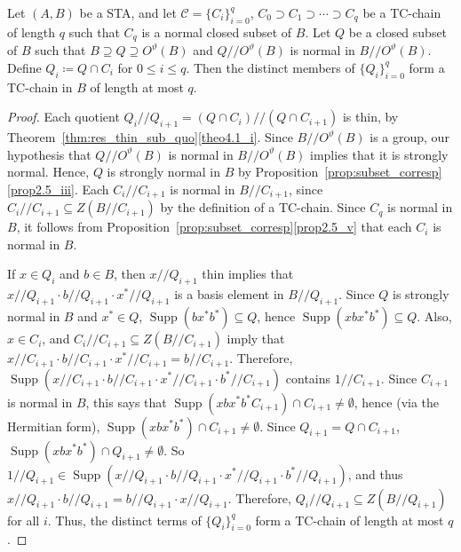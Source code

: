 \documentclass[ALCO,ThmDefs,Unicode,epreuves]{cedram}
\DeclareMathOperator{\Supp}{Supp}
\begin{document}
\begin{lemm}
\label{lem:to_lower}
Let $(A, B)$ be a STA, and let $\mathcal{C} =
\{C_i\}_{i=0}^q$, $C_0 \supset C_1 \supset \cdots \supset C_q$ 
be a TC-chain of length $q$ such that $C_q$ is a normal closed subset of
$B$. 
 Let $Q$ be a closed subset of $B$ such that $B \supseteq Q \supseteq
O^{\vartheta}(B)$ and $Q//O^{\vartheta}(B)$ is normal in
$B//O^{\vartheta}(B)$. Define $Q_i \coloneqq Q\cap C_i$ for $0 \leq i \leq q$. 
Then the distinct members of $\{Q_i\}_{i=0}^q$ form a TC-chain in $B$ of length
at most $q$.
\end{lemm}

\begin{proof}
Each quotient $Q_i//Q_{i+1} = (Q\cap C_i)//(Q\cap C_{i+1})$
is thin, by Theorem~\ref{thm:res_thin_sub_quo}\ref{theo4.1_i}. Since
$B//O^{\vartheta}(B)$ is a group, our hypothesis that
$Q//O^{\vartheta}(B)$ is normal in $B//O^{\vartheta}(B)$ implies that it
is strongly normal. Hence, $Q$ is strongly normal in $B$ by Proposition~\ref{prop:subset_corresp}\ref{prop2.5_iii}. Each $C_i//C_{i+1}$ is normal in
$B//C_{i+1}$, since $C_i//C_{i+1} \subseteq Z(B//C_{i+1})$ by the
definition of a TC-chain. Since $C_q$ is normal in $B$, it follows from
Proposition~\ref{prop:subset_corresp}\ref{prop2.5_v} that each $C_i$ is normal in $B$.
 
 If $x \in Q_i$ and
$b \in B$, then $x//Q_{i+1}$ thin implies that $x//Q_{i+1}\cdot
b//Q_{i+1}\cdot x^*//Q_{i+1}$ is a basis element in $B//Q_{i+1}$. Since
$Q$ is strongly normal in $B$ and $x^* \in Q$, $\Supp (bx^*b^*)
\subseteq Q$, hence $\Supp (xbx^*b^*) \subseteq Q$. Also, $x
\in C_i$, and $C_i//C_{i+1} \subseteq Z(B//C_{i+1})$
imply that $x//C_{i+1}\cdot b//C_{i+1}\cdot x^*//C_{i+1} =
b//C_{i+1}$. Therefore, $\Supp (x//C_{i+1}\cdot
b//C_{i+1}\cdot x^*//C_{i+1}\cdot b^*//C_{i+1})$ contains
$1//C_{i+1}$. Since $C_{i+1}$ is normal in $B$, this says that
$\Supp (xbx^*b^*C_{i+1})\cap C_{i+1} \neq \emptyset$, hence (via the
Hermitian form), $\Supp (xbx^*b^*)\cap C_{i+1} \neq \emptyset$. Since
$Q_{i+1} = Q\cap C_{i+1}$, $\Supp (xbx^*b^*)\cap Q_{i+1} \neq
\emptyset$. So $1//Q_{i+1} \in \Supp (x//Q_{i+1}\cdot
b//Q_{i+1}\cdot x^*//Q_{i+1}\cdot b^*//Q_{i+1})$, and thus
$x//Q_{i+1}\cdot b//Q_{i+1} = b//Q_{i+1}\cdot x//Q_{i+1}$. Therefore,
$Q_i//Q_{i+1} \subseteq Z(B//Q_{i+1})$ for all $i$. 
Thus, the distinct terms of $\{Q_i\}_{i=0}^q$ form a
TC-chain of length at most $q$. 
\end{proof} 
\end{document}
